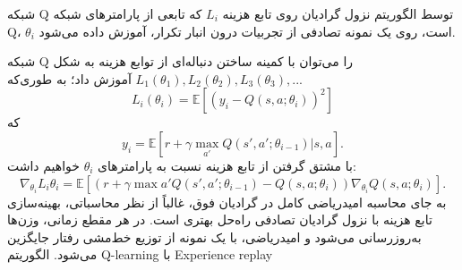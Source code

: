 
 شبکه Q توسط الگوریتم نزول گرادیان روی تابع هزینه 
$L_i$
که تابعی از پارامترهای شبکه 
Q،
$\theta_i$
 است، روی یک نمونه تصادفی از تجربیات درون انبار تکرار، آموزش داده می‌شود.






شبکه Q را می‌توان با کمینه ساختن دنباله‌ای از توابع هزینه به شکل 
$L_1(\theta_1), L_2(\theta_2), L_3(\theta_3), ... $ آموزش داد؛ به طوری‌که
$$L_i(\theta_i)=\mathbb{E}\left[(y_i - Q(s,a;\theta_i))^2\right]$$  که  $$y_i = \mathbb{E}[r + \gamma \max_{a'} Q(s',a'; \theta_{i-1})| s,a].$$ با مشتق گرفتن از تابع هزینه نسبت به پارامترهای $\theta_i$  خواهیم داشت: $$\nabla_{\theta_i} L_i{\theta_i} = \mathbb{E}\left[ \left(r + \gamma \max{a'} Q(s',a';\theta_{i-1}) - Q(s,a;\theta_i)\right) \nabla_{\theta_i} Q(s,a;\theta_i)\right].$$
به جای محاسبه امیدریاضی کامل در گرادیان فوق، غالباً از نظر محاسباتی، بهینه‌سازی تابع هزینه با نزول گرادیان تصادفی   راه‌حل بهتری است. در هر مقطع زمانی، وزن‌ها به‌روزرسانی می‌شود و امیدریاضی، با یک نمونه از توزیع خط‌مشی رفتار  جایگزین می‌شود.
{الگوریتم Q-learning با Experience replay}

